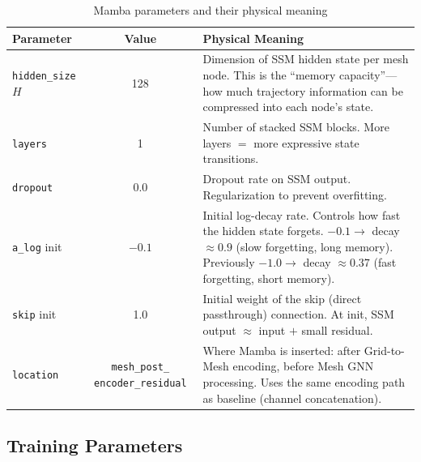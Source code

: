 \documentclass[11pt,a4paper]{article}
\begin{document}
\begin{table}[H]
\centering
\caption{Mamba parameters and their physical meaning}
\begin{tabular}{p{3.5cm}cp{7cm}}
\toprule
Parameter & Value & Physical Meaning \\
\midrule
\texttt{hidden\_size} $H$ & 128 & Dimension of SSM hidden state per mesh node. This is the ``memory capacity''---how much trajectory information can be compressed into each node's state. \\
\texttt{layers} & 1 & Number of stacked SSM blocks. More layers $=$ more expressive state transitions. \\
\texttt{dropout} & 0.0 & Dropout rate on SSM output. Regularization to prevent overfitting. \\
\texttt{a\_log} init & $-0.1$ & Initial log-decay rate. Controls how fast the hidden state forgets. $-0.1 \to$ decay $\approx 0.9$ (slow forgetting, long memory). Previously $-1.0 \to$ decay $\approx 0.37$ (fast forgetting, short memory). \\
\texttt{skip} init & 1.0 & Initial weight of the skip (direct passthrough) connection. At init, SSM output $\approx$ input $+$ small residual. \\
\texttt{location} & \texttt{mesh\_post\_} \texttt{encoder\_residual} & Where Mamba is inserted: after Grid-to-Mesh encoding, before Mesh GNN processing. Uses the same encoding path as baseline (channel concatenation). \\
\bottomrule
\end{tabular}
\end{table}

\subsection{Training Parameters}
\end{document}

